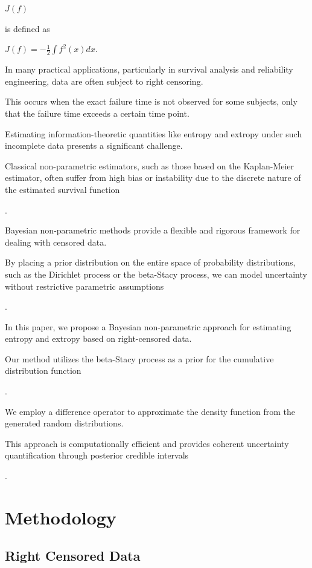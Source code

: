 \documentclass[10pt,twoside]{article}
\numberwithin{equation}{section}
\begin{document}
$J(f)$ 

is defined as 

$J(f) = -\frac{1}{2} \int f^{2}(x) dx$. 


In many practical applications, particularly in survival analysis and reliability engineering, data are often subject to right censoring. 

This occurs when the exact failure time is not observed for some subjects, only that the failure time exceeds a certain time point. 

Estimating information-theoretic quantities like entropy and extropy under such incomplete data presents a significant challenge. 

Classical non-parametric estimators, such as those based on the Kaplan-Meier estimator, often suffer from high bias or instability due to the discrete nature of the estimated survival function 

\citep{6}. 


Bayesian non-parametric methods provide a flexible and rigorous framework for dealing with censored data. 

By placing a prior distribution on the entire space of probability distributions, such as the Dirichlet process or the beta-Stacy process, we can model uncertainty without restrictive parametric assumptions 

\citep{5,6}. 


In this paper, we propose a Bayesian non-parametric approach for estimating entropy and extropy based on right-censored data. 

Our method utilizes the beta-Stacy process as a prior for the cumulative distribution function

\citep{3}. 

We employ a difference operator to approximate the density function from the generated random distributions. 

This approach is computationally efficient and provides coherent uncertainty quantification through posterior credible intervals

\citep{0}. 


\section{Methodology}





\subsection{Right Censored Data}
\end{document}
